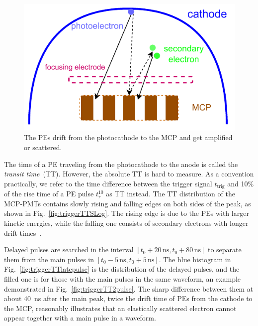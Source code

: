 \begin{figure}[!htbp]
    \centering
    \includegraphics[width=\MF\textwidth]{figures/method/MCPelectron.pdf}
    \caption{The PEs drift from the photocathode to the MCP and get amplified or scattered.}%
    \label{fig:mcpelectron}
\end{figure}

The time of a PE traveling from the photocathode to the anode is called the \emph{transit time}~(TT). However, the absolute TT is hard to measure. As a convention practically, we refer to the time difference between the trigger signal $t_{\mathrm{trig}}$ and 10\% of the rise time of a PE pulse $t_r^{10}$ as TT instead. The $\mathrm{TT}$ distribution of the MCP-PMTs contains slowly rising and falling edges on both sides of the peak, as shown in Fig.~\ref{fig:triggerTTSLog}. The rising edge is due to the PEs with larger kinetic energies, while the falling one consists of secondary electrons with longer drift times~\cite{longtail}.

Delayed pulses are searched in the interval $[t_0+20\,\mathrm{ns},t_0+80\,\mathrm{ns}]$ to separate them from the main pulses in $[t_0-5\,\mathrm{ns},t_0+5\,\mathrm{ns}]$. The blue histogram in Fig.~\ref{fig:triggerTTlatepulse} is the distribution of the delayed pulses, and the filled one is for those with the main pulses in the same waveform, an example demonstrated in Fig.~\ref{fig:triggerTT2pulse}. The sharp difference between them at about \SI{40}{ns} after the main peak, twice the drift time of PEs from the cathode to the MCP, reasonably illustrates that an elastically scattered electron cannot appear together with a main pulse in a waveform.

